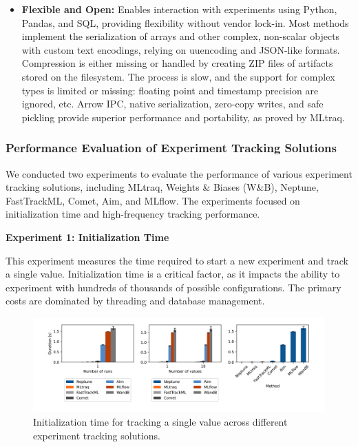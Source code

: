 \begin{itemize}
    \item \textbf{Flexible and Open:} Enables interaction with experiments using Python, Pandas, and SQL, providing flexibility without vendor lock-in. Most methods implement the serialization of arrays and other complex, non-scalar objects with custom text encodings, relying on uuencoding and JSON-like formats. Compression is either missing or handled by creating ZIP files of artifacts stored on the filesystem. The process is slow, and the support for complex types is limited or missing: floating point and timestamp precision are ignored, etc. Arrow IPC, native serialization, zero-copy writes, and safe pickling provide superior performance and portability, as proved by MLtraq. \cite{mltraq2024}
\end{itemize}

\subsubsection{Performance Evaluation of Experiment Tracking Solutions}

We conducted two experiments to evaluate the performance of various experiment tracking solutions, including MLtraq, Weights \& Biases (W\&B), Neptune, FastTrackML, Comet, Aim, and MLflow. The experiments focused on initialization time and high-frequency tracking performance.\newline

\textbf{Experiment 1: Initialization Time}

This experiment measures the time required to start a new experiment and track a single value. Initialization time is a critical factor, as it impacts the ability to experiment with hundreds of thousands of possible configurations. The primary costs are dominated by threading and database management.

\begin{figure}[h!]
    \centering
    \includegraphics[width=\textwidth]{images/mltraq/mltraq-Initialization-time.png}
    \caption{Initialization time for tracking a single value across different experiment tracking solutions.}
    \label{fig:init-time}
\end{figure}

